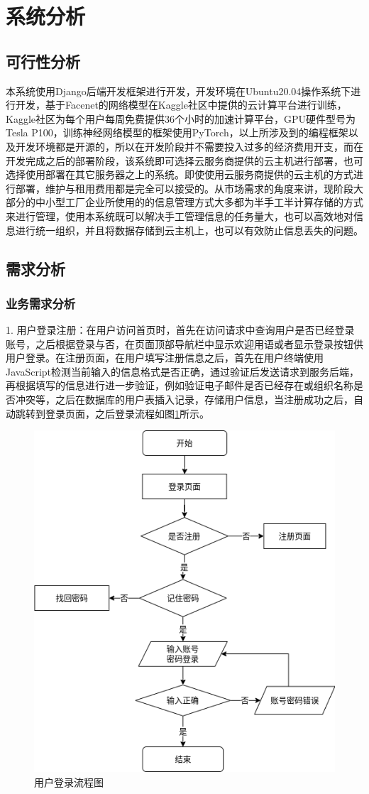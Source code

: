 \section{系统分析}

\subsection{可行性分析}

本系统使用Django后端开发框架进行开发，开发环境在Ubuntu20.04操作系统下进行开发，基于Facenet的网络模型在Kaggle社区中提供的云计算平台进行训练，Kaggle社区为每个用户每周免费提供36个小时的加速计算平台，GPU硬件型号为Tesla P100，训练神经网络模型的框架使用PyTorch，以上所涉及到的编程框架以及开发环境都是开源的，所以在开发阶段并不需要投入过多的经济费用开支，而在开发完成之后的部署阶段，该系统即可选择云服务商提供的云主机进行部署，也可选择使用部署在其它服务器之上的系统。即使使用云服务商提供的云主机的方式进行部署，维护与租用费用都是完全可以接受的。从市场需求的角度来讲，现阶段大部分的中小型工厂企业所使用的的信息管理方式大多都为半手工半计算存储的方式来进行管理，使用本系统既可以解决手工管理信息的任务量大，也可以高效地对信息进行统一组织，并且将数据存储到云主机上，也可以有效防止信息丢失的问题。

\subsection{需求分析}

\subsubsection{业务需求分析}

1. 用户登录注册：在用户访问首页时，首先在访问请求中查询用户是否已经登录账号，之后根据登录与否，在页面顶部导航栏中显示欢迎用语或者显示登录按钮供用户登录。在注册页面，在用户填写注册信息之后，首先在用户终端使用JavaScript检测当前输入的信息格式是否正确，通过验证后发送请求到服务后端，再根据填写的信息进行进一步验证，例如验证电子邮件是否已经存在或组织名称是否冲突等，之后在数据库的用户表插入记录，存储用户信息，当注册成功之后，自动跳转到登录页面，之后登录流程如图\ref{fig:login}所示。

\begin{figure}[H]
    \centering
    \includegraphics[width=.4\textwidth]{figures/3loginprocess.png}
    \caption{用户登录流程图}
    \label{fig:login}
\end{figure}

